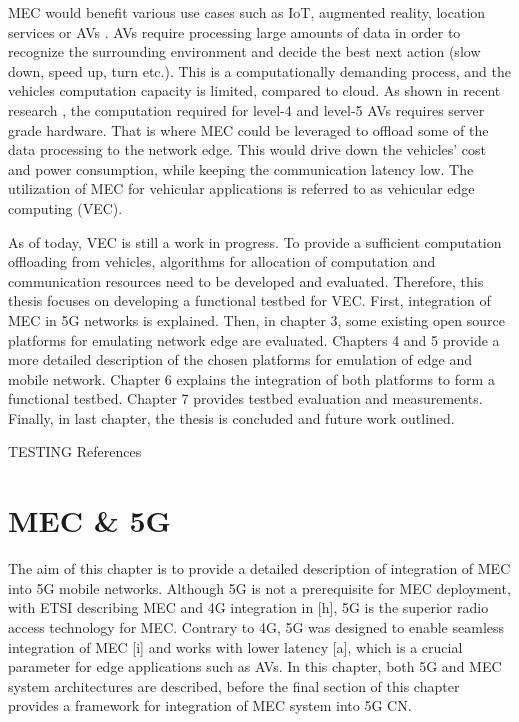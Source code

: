\documentclass[12pt,a4paper,twoside]{report}
\begin{document}
MEC would benefit various use cases such as IoT, augmented reality, location services or AVs \cite{etsi-web}. AVs require processing large amounts of data in order to recognize the surrounding environment and decide the best next action (slow down, speed up, turn etc.). This is a computationally demanding process, and the vehicles computation capacity is limited, compared to cloud. As shown in recent research \cite{zhao2019towards}, the computation required for level-4 and level-5 AVs requires server grade hardware. That is where MEC could be leveraged to offload some of the data processing to the network edge. This would drive down the vehicles’ cost and power consumption, while keeping the communication latency low. The utilization of MEC for vehicular applications is referred to as vehicular edge computing (VEC). 

As of today, VEC is still a work in progress. To provide a sufficient computation offloading from vehicles, algorithms for allocation of computation and communication resources need to be developed and evaluated. Therefore, this thesis focuses on developing a functional testbed for VEC. First, integration of MEC in 5G networks is explained. Then, in chapter 3, some existing open source platforms for emulating network edge are evaluated. Chapters 4 and 5 provide a more detailed description of the chosen platforms for emulation of edge and mobile network. Chapter 6 explains the integration of both platforms to form a functional testbed. Chapter 7 provides testbed evaluation and measurements. Finally, in last chapter, the thesis is concluded and future work outlined. 

TESTING References
\cite{ETSI:GS:MEC003,ETSI:WP:28,ETSI:WP:24}

\chapter{MEC \& 5G}
The aim of this chapter is to provide a detailed description of integration of MEC into 5G mobile networks. Although 5G is not a prerequisite for MEC deployment, with ETSI describing MEC and 4G integration in [h], 5G is the superior radio access technology for MEC. Contrary to 4G, 5G was designed to enable seamless integration of MEC [i] and works with lower latency [a], which is a crucial parameter for edge applications such as AVs.  In this chapter, both 5G  and MEC system architectures are described, before the final section of this chapter provides a framework for integration of MEC system into 5G CN.
\end{document}
